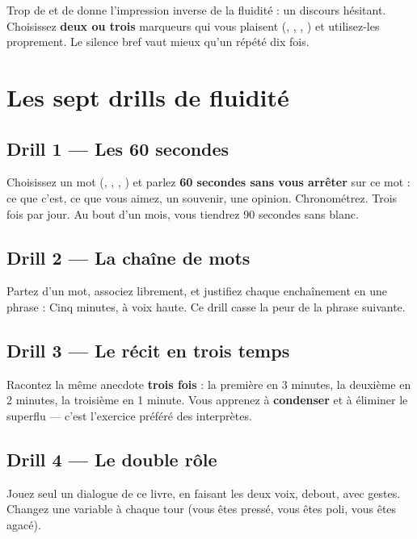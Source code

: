\begin{piege}
Trop de  et de  donne l'impression inverse de la fluidité : un discours
hésitant. Choisissez \textbf{deux ou trois} marqueurs qui vous plaisent (,
, , ) et utilisez-les proprement. Le silence bref
vaut mieux qu'un  répété dix fois.
\end{piege}

\section{Les sept drills de fluidité}

\subsection{Drill 1 --- Les 60 secondes}
Choisissez un mot (, , , ) et parlez \textbf{60
secondes sans vous arrêter} sur ce mot : ce que c'est, ce que vous aimez, un souvenir,
une opinion. Chronométrez. Trois fois par jour. Au bout d'un mois, vous tiendrez
90 secondes sans blanc.

\subsection{Drill 2 --- La chaîne de mots}
Partez d'un mot, associez librement, et justifiez chaque enchaînement en une phrase :
Cinq minutes, à voix haute. Ce drill casse la peur de la phrase suivante.

\subsection{Drill 3 --- Le récit en trois temps}
Racontez la même anecdote \textbf{trois fois} : la première en 3 minutes, la deuxième en
2 minutes, la troisième en 1 minute. Vous apprenez à \textbf{condenser} et à éliminer le
superflu --- c'est l'exercice préféré des interprètes.

\subsection{Drill 4 --- Le double rôle}
Jouez seul un dialogue de ce livre, en faisant les deux voix, debout, avec gestes.
Changez une variable à chaque tour (vous êtes pressé, vous êtes poli, vous êtes agacé).

